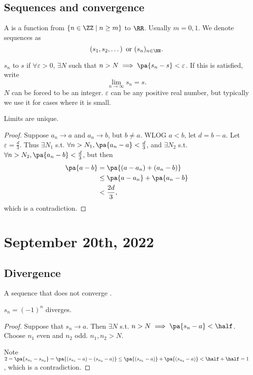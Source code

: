 \documentclass[11pt]{scrartcl}
\numberwithin{equation}{section}
\begin{document}
\subsection{Sequences and convergence}
\begin{definition}
    A  is a function from 
    $\left\{n \in\ZZ\mid n\geq m\right\}$ to $\RR$.
    Usually $m=0,1$. We denote sequences as 
    \[ \left(s_1,s_2,\dots\right) \text{ or } (s_n)_{n\in\NN}.\]
\end{definition}
\begin{definition}
    $s_n$  to $s$ if $\forall\varepsilon > 0$,
    $\exists N$ such that $n>N \implies \pa{s_n-s} < \varepsilon$.
    If this is satisfied, write 
    \[ 
        \lim_{n\rightarrow\infty} s_n = s. 
    \]
    $N$ can be forced to be an integer.
    $\varepsilon$ can be any positive real number, but typically we use 
    it for cases where it is small.
\end{definition}
\begin{proposition}
    Limits are unique. 
\end{proposition}
\begin{proof}
    Suppose $a_n \rightarrow a$ and $a_n\rightarrow b$, but $b\neq a$.
    WLOG $a<b$, let $d=b-a$. Let 
    $\varepsilon = \frac{d}{3}$. Thus $\exists N_1$ s.t. 
    $\forall n>N_1, \pa{a_n-a} < \frac{d}{3}$, and $\exists N_2$ s.t. 
    $\forall n>N_2, \pa{a_n-b} < \frac{d}{3}$, but then 
    \begin{align*}
        \pa{a-b} &= \pa{(a-a_n)+ (a_n-b)} \\
        &\leq  \pa{a-a_n} + \pa{a_n-b} \\ 
        &< \frac{2d}{3}, 
    \end{align*}
    which is a contradiction.
\end{proof}
\clearpage
\section{September 20th, 2022}
\subsection{Divergence}
A sequence that does not converge .
\begin{example}
    $s_n = (-1)^n$ diverges.
    \begin{proof}
        Suppose that $s_n\rightarrow a$. Then 
        $\exists N$ s.t. $n>N\implies \pa{s_n-a}<\half$.
        Choose $n_1$ even and $n_2$ odd. $n_1,n_2>N$.
    
        Note $2=\pa{s_{n_1} - s_{n_2}} = \pa{(s_{n_1} - a) - (s_{n_2} - a)}
        \leq \pa{(s_{n_1} - a)} + \pa{(s_{n_2} - a)} < \half + \half = 1$,
        which is a contradiction.
    \end{proof}
\end{example}
\end{document}
